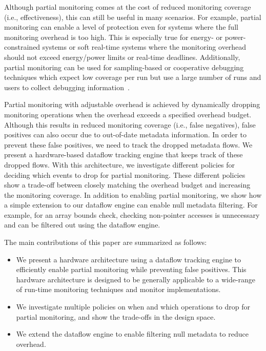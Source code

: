 Although partial monitoring comes at the cost of reduced monitoring coverage (i.e.,
effectiveness), this can still be useful in many scenarios.
For example, partial
monitoring can enable a level of protection even for systems where the full
monitoring overhead is too high. This is especially true for energy- or
power-constrained systems or soft real-time systems where the monitoring
overhead should not exceed energy/power limits or real-time deadlines.
Additionally, partial monitoring can be used for sampling-based or cooperative debugging techniques
which expect low coverage per run but use a large number of runs and users to
collect debugging information~\cite{liblit-pldi05, chilimbi-asplos04,
greathouse-cgo11}. 

Partial monitoring with adjustable overhead is achieved by dynamically
dropping monitoring operations when the overhead exceeds a specified overhead
budget. Although this results in reduced monitoring coverage (i.e., false
negatives), false positives can also occur due to out-of-date metadata information.
In order to prevent these
false positives, we need to track the dropped metadata flows.  We present a
hardware-based dataflow tracking engine that keeps track of these dropped
flows. With this architecture, we investigate different policies for deciding
which events to drop for partial monitoring. These different policies show a
trade-off between closely matching the overhead budget and increasing the monitoring
coverage.
In addition to enabling partial monitoring, we show how a simple
extension to our dataflow engine can enable null metadata filtering.
For example, for an array bounds check, checking non-pointer accesses is
unnecessary and can be filtered out using the dataflow engine.

The main contributions of this paper are summarized as follows:
\begin{itemize}
  \item We present a hardware architecture using a dataflow tracking engine to
  efficiently enable partial monitoring while preventing false positives. This
  hardware architecture is designed to be generally applicable to a wide-range
  of run-time monitoring techniques and monitor implementations.
  \item We investigate multiple policies on when and which operations to drop 
  for partial monitoring, and show the trade-offs in the design space.
  \item We extend the dataflow engine to enable filtering null metadata to
  reduce overhead.
\end{itemize}

